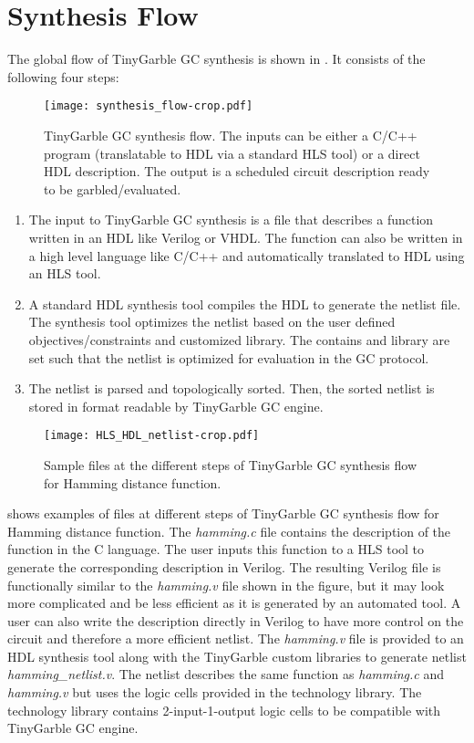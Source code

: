\section{Synthesis Flow}\label{sec:syn-flow}
The global flow of TinyGarble GC synthesis is shown in .
It consists of the following four steps:

\begin{figure}[ht]
\centering
\texttt{[image: synthesis\_flow-crop.pdf]}
\caption{TinyGarble GC synthesis flow.
  The inputs can be either a C/C++ program (translatable to HDL via a standard HLS tool) or a direct HDL description.
  The output is a scheduled circuit description ready to be garbled/evaluated.}
\label{fig:synthesis-flow}
\end{figure}

\begin{enumerate}
\item The input to TinyGarble GC synthesis is a file that describes a function written in an HDL like Verilog or VHDL.
      The function can also be written in a high level language like C/C++ and automatically translated to HDL using an HLS tool.

\item A standard HDL synthesis tool compiles the HDL to generate the netlist file.
      The synthesis tool optimizes the netlist based on the user defined objectives/constraints and customized library.
      The contains and library are set such that the netlist is optimized for evaluation in the GC protocol.

\item The netlist is parsed and topologically sorted.
      Then, the sorted netlist is stored in format readable by TinyGarble GC engine.
\end{enumerate}

\begin{figure}[ht]
\centering
\texttt{[image: HLS\_HDL\_netlist-crop.pdf]}
\caption{Sample files at the different steps of TinyGarble GC synthesis flow for Hamming distance function.}
\label{fig:globalflow_sample}
\end{figure}

 shows examples of files at different steps of TinyGarble GC synthesis flow for Hamming distance function.
The \textsl{hamming.c} file contains the description of the function in the C language.
The user inputs this function to a HLS tool to generate the corresponding description in Verilog.
The resulting Verilog file is functionally similar to the \textsl{hamming.v} file shown in the figure, but it may look more complicated and be less efficient as it is generated by an automated tool.
A user can also write the description directly in Verilog to have more control on the circuit and therefore a more efficient netlist.
The \textsl{hamming.v} file is provided to an HDL synthesis tool along with the TinyGarble custom libraries to generate netlist \textsl{hamming\_netlist.v}.
The netlist describes the same function as \textsl{hamming.c} and \textsl{hamming.v} but uses the logic cells provided in the technology library.
The technology library contains 2-input-1-output logic cells to be compatible with TinyGarble GC engine.

